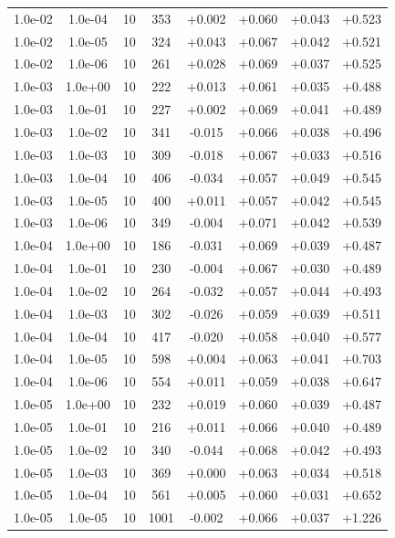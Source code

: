 \documentclass[11pt,a4paper]{article}
\begin{document}
\begin{table}
{\begin{tabular}{*{8}c}
 1.0e-02 	 & 1.0e-04 	 & 10 & 353 	 & +0.002 & +0.060 & +0.043 & +0.523 \\ 
 1.0e-02 	 & 1.0e-05 	 & 10 & 324 	 & +0.043 & +0.067 & +0.042 & +0.521 \\ 
 1.0e-02 	 & 1.0e-06 	 & 10 & 261 	 & +0.028 & +0.069 & +0.037 & +0.525 \\ 
 1.0e-03 	 & 1.0e+00 	 & 10 & 222 	 & +0.013 & +0.061 & +0.035 & +0.488 \\ 
 1.0e-03 	 & 1.0e-01 	 & 10 & 227 	 & +0.002 & +0.069 & +0.041 & +0.489 \\ 
 1.0e-03 	 & 1.0e-02 	 & 10 & 341 	 & -0.015 & +0.066 & +0.038 & +0.496 \\ 
 1.0e-03 	 & 1.0e-03 	 & 10 & 309 	 & -0.018 & +0.067 & +0.033 & +0.516 \\ 
 1.0e-03 	 & 1.0e-04 	 & 10 & 406 	 & -0.034 & +0.057 & +0.049 & +0.545 \\ 
 1.0e-03 	 & 1.0e-05 	 & 10 & 400 	 & +0.011 & +0.057 & +0.042 & +0.545 \\ 
 1.0e-03 	 & 1.0e-06 	 & 10 & 349 	 & -0.004 & +0.071 & +0.042 & +0.539 \\ 
 1.0e-04 	 & 1.0e+00 	 & 10 & 186 	 & -0.031 & +0.069 & +0.039 & +0.487 \\ 
 1.0e-04 	 & 1.0e-01 	 & 10 & 230 	 & -0.004 & +0.067 & +0.030 & +0.489 \\ 
 1.0e-04 	 & 1.0e-02 	 & 10 & 264 	 & -0.032 & +0.057 & +0.044 & +0.493 \\ 
 1.0e-04 	 & 1.0e-03 	 & 10 & 302 	 & -0.026 & +0.059 & +0.039 & +0.511 \\ 
 1.0e-04 	 & 1.0e-04 	 & 10 & 417 	 & -0.020 & +0.058 & +0.040 & +0.577 \\ 
 1.0e-04 	 & 1.0e-05 	 & 10 & 598 	 & +0.004 & +0.063 & +0.041 & +0.703 \\ 
 1.0e-04 	 & 1.0e-06 	 & 10 & 554 	 & +0.011 & +0.059 & +0.038 & +0.647 \\ 
 1.0e-05 	 & 1.0e+00 	 & 10 & 232 	 & +0.019 & +0.060 & +0.039 & +0.487 \\ 
 1.0e-05 	 & 1.0e-01 	 & 10 & 216 	 & +0.011 & +0.066 & +0.040 & +0.489 \\ 
 1.0e-05 	 & 1.0e-02 	 & 10 & 340 	 & -0.044 & +0.068 & +0.042 & +0.493 \\ 
 1.0e-05 	 & 1.0e-03 	 & 10 & 369 	 & +0.000 & +0.063 & +0.034 & +0.518 \\ 
 1.0e-05 	 & 1.0e-04 	 & 10 & 561 	 & +0.005 & +0.060 & +0.031 & +0.652 \\ 
\rowcolor{red} 1.0e-05 	 & 1.0e-05 	 & 10 & 1001 	 & -0.002 & +0.066 & +0.037 & +1.226 \\ 

\end{tabular}}
\end{table}
\end{document}
